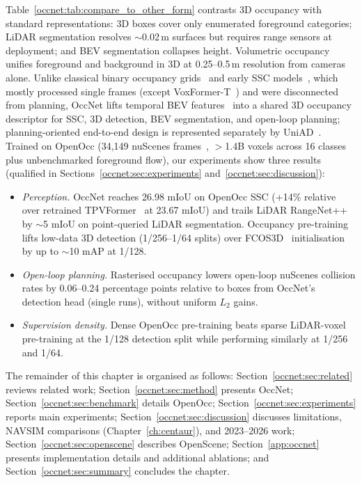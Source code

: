 Table~\ref{occnet:tab:compare_to_other_form} contrasts 3D occupancy with standard representations: 3D boxes cover only enumerated foreground categories; LiDAR segmentation resolves $\sim$0.02\,m surfaces but requires range sensors at deployment; and BEV segmentation collapses height. Volumetric occupancy unifies foreground and background in 3D at 0.25--0.5\,m resolution from cameras alone. Unlike classical binary occupancy grids~\cite{moravec1985high,elfes1989using} and early SSC models~\cite{song2017sscnet,huang2023tpvformer,li2023voxformer,cao2022monoscene,miao2023occdepth}, which mostly processed single frames (except VoxFormer-T~\cite{li2023voxformer}) and were disconnected from planning, OccNet lifts temporal BEV features~\cite{li2022bevformer,chen2022persformer,wang2022monocular} into a shared 3D occupancy descriptor for SSC, 3D detection, BEV segmentation, and open-loop planning; planning-oriented end-to-end design is represented separately by UniAD~\cite{hu2023uniad}. Trained on OpenOcc (34,149 nuScenes frames~\cite{caesar2020nuscenes,fong2022panoptic}, $>$1.4B voxels across 16 classes plus unbenchmarked foreground flow), our experiments show three results (qualified in Sections~\ref{occnet:sec:experiments} and~\ref{occnet:sec:discussion}):
\begin{itemize}
  \item \emph{Perception.} OccNet reaches 26.98 mIoU on OpenOcc SSC (+14\% relative over retrained TPVFormer~\cite{huang2023tpvformer} at 23.67 mIoU) and trails LiDAR RangeNet++~\cite{milioto2019rangenet++} by $\sim$5 mIoU on point-queried LiDAR segmentation. Occupancy pre-training lifts low-data 3D detection (1/256--1/64 splits) over FCOS3D~\cite{wang2021fcos3d} initialisation by up to $\sim$10 mAP at 1/128.
  \item \emph{Open-loop planning.} Rasterised occupancy lowers open-loop nuScenes collision rates by 0.06--0.24 percentage points relative to boxes from OccNet's detection head (single runs), without uniform $L_2$ gains.
  \item \emph{Supervision density.} Dense OpenOcc pre-training beats sparse LiDAR-voxel pre-training at the 1/128 detection split while performing similarly at 1/256 and 1/64.
\end{itemize}

The remainder of this chapter is organised as follows: Section~\ref{occnet:sec:related} reviews related work; Section~\ref{occnet:sec:method} presents OccNet; Section~\ref{occnet:sec:benchmark} details OpenOcc; Section~\ref{occnet:sec:experiments} reports main experiments; Section~\ref{occnet:sec:discussion} discusses limitations, NAVSIM comparisons (Chapter~\ref{ch:centaur}), and 2023--2026 work; Section~\ref{occnet:sec:openscene} describes OpenScene; Section~\ref{app:occnet} presents implementation details and additional ablations; and Section~\ref{occnet:sec:summary} concludes the chapter.

